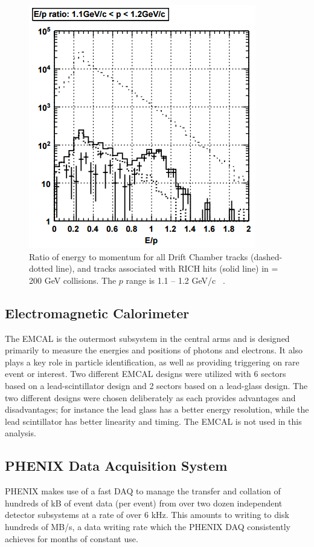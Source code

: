 \begin{figure}[!ht]
\begin{center}
\includegraphics[width=0.55\linewidth]{figs/e_over_p_rich_discrimination.png}
\caption{Ratio of energy to momentum for all Drift Chamber tracks (dashed-dotted line), and tracks associated with RICH hits (solid line) in \auau \sqsn = 200 GeV collisions. The $p$ range is 1.1 -- 1.2 GeV/c ~\cite{Aizawa2003508}.}
\label{fig:rich_discrim_ep}
\end{center}
\end{figure}

\subsection{Electromagnetic Calorimeter}
The EMCAL is the outermost subsystem in the central arms and is designed primarily to measure the energies and positions of photons and electrons. It also plays a key role in particle identification, as well as providing triggering on rare event or interest. Two different EMCAL designs were utilized with 6 sectors based on a lead-scintillator design and 2 sectors based on a lead-glass design. The two different designs were chosen deliberately as each provides advantages and disadvantages; for instance the lead glass has a better energy resolution, while the lead scintillator has better linearity and timing. The EMCAL is not used in this analysis.

\subsection{PHENIX Data Acquisition System}
\label{sec:PHENIX_DAQ}
PHENIX makes use of a fast DAQ to manage the transfer and collation of hundreds of kB of event data (per event) from over two dozen independent detector subsystems at a rate of over 6 kHz. This amounts to writing to disk hundreds of MB/s, a data writing rate which the PHENIX DAQ consistently achieves for months of constant use. 

